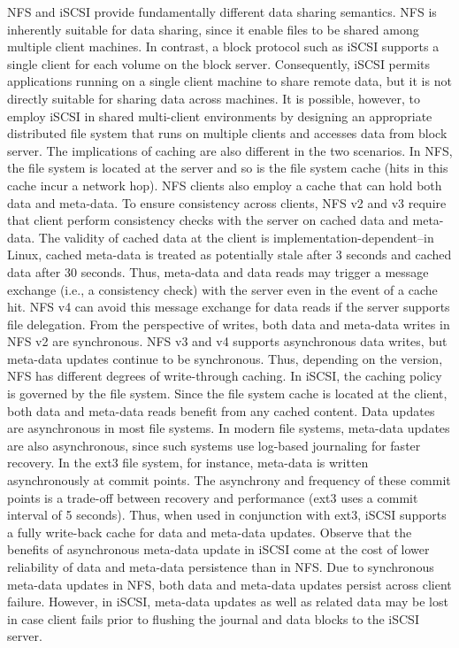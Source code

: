 \documentclass[letterpaper,10pt,english]{sphinxmanual}
\begin{document}
NFS and iSCSI provide fundamentally different data sharing semantics. NFS is inherently suitable for data sharing, since it enable files to be shared among multiple client machines. In contrast, a block protocol such as iSCSI supports a single client for each volume on the block server. Consequently, iSCSI permits applications running on a single client machine to share remote data, but it is not directly suitable for sharing data across machines. It is possible, however, to employ iSCSI in shared multi-client environments by designing an appropriate distributed file system that runs on multiple clients and accesses data from block server.
The implications of caching are also different in the two scenarios. In NFS, the file system is located at the server and so is the file system cache (hits in this cache incur a network hop). NFS clients also employ a cache that can hold both data and meta-data. To ensure consistency across clients, NFS v2 and v3 require that client perform consistency checks with the server on cached data and meta-data. The validity of cached data at the client is implementation-dependent--in Linux, cached meta-data is treated as potentially stale after 3 seconds and cached data after 30 seconds. Thus, meta-data and data reads may trigger a message exchange (i.e., a consistency check) with the server even in the event of a cache hit. NFS v4 can avoid this message exchange for data reads if the server supports file delegation. From the perspective of writes, both data and meta-data writes in NFS v2 are synchronous. NFS v3 and v4 supports asynchronous data writes, but meta-data updates continue to be synchronous. Thus, depending on the version, NFS has different degrees of write-through caching.
In iSCSI, the caching policy is governed by the file system. Since the file system cache is located at the client, both data and meta-data reads benefit from any cached content. Data updates are asynchronous in most file systems. In modern file systems, meta-data updates are also asynchronous, since such systems use log-based journaling for faster recovery. In the ext3 file system, for instance, meta-data is written asynchronously at commit points. The asynchrony and frequency of these commit points is a trade-off between recovery and performance (ext3 uses a commit interval of 5 seconds). Thus, when used in conjunction with ext3, iSCSI supports a fully write-back cache for data and meta-data updates.
Observe that the benefits of asynchronous meta-data update in iSCSI come at the cost of lower reliability of data and meta-data persistence than in NFS. Due to synchronous meta-data updates in NFS, both data and meta-data updates persist across client failure. However, in iSCSI, meta-data updates as well as related data may be lost in case client fails prior to flushing the journal and data blocks to the iSCSI server.
\end{document}
